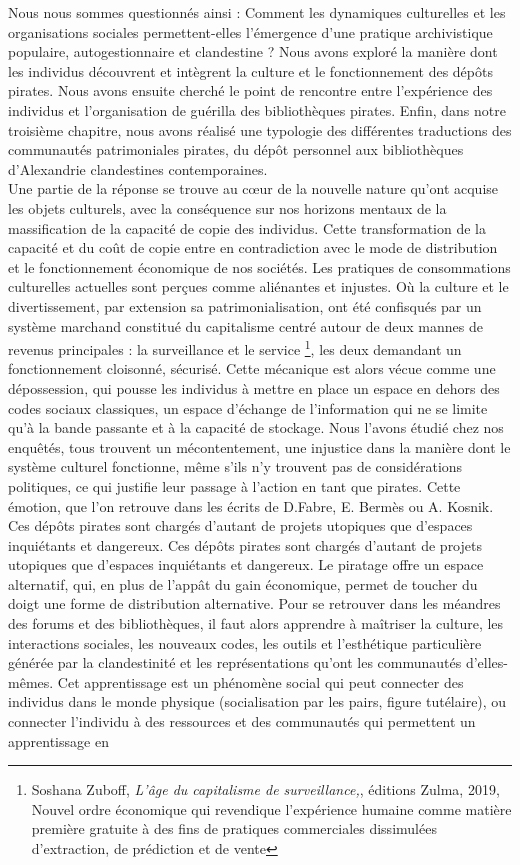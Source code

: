 Nous nous sommes questionnés ainsi : Comment les dynamiques culturelles et les organisations sociales permettent-elles l'émergence d'une pratique archivistique populaire, autogestionnaire et clandestine ? Nous avons exploré la manière dont les individus découvrent et intègrent la culture et le fonctionnement des dépôts pirates. Nous avons ensuite cherché le point de rencontre entre l'expérience des individus et l'organisation de guérilla des bibliothèques pirates. Enfin, dans notre troisième chapitre, nous avons réalisé une typologie des différentes traductions des communautés patrimoniales pirates, du dépôt personnel aux bibliothèques d'Alexandrie clandestines contemporaines.\\

Une partie de la réponse se trouve au cœur de la nouvelle nature qu'ont acquise les objets culturels, avec la conséquence sur nos horizons mentaux de la massification de la capacité de copie des individus. Cette transformation de la capacité et du coût de copie entre en contradiction avec le mode de distribution et le fonctionnement économique de nos sociétés. Les pratiques de consommations culturelles actuelles sont perçues comme aliénantes et injustes. Où la culture et le divertissement, par extension sa patrimonialisation, ont été confisqués par un système marchand constitué du capitalisme centré autour de deux mannes de revenus principales : la surveillance et le service \footnote{Soshana Zuboff, \textit{L'âge du capitalisme de surveillance,}, éditions Zulma, 2019, \og Nouvel ordre économique qui revendique l'expérience humaine comme matière première gratuite à des fins de pratiques commerciales dissimulées d'extraction, de prédiction et de vente \fg }, les deux demandant un fonctionnement cloisonné, sécurisé. Cette mécanique est alors vécue comme une dépossession, qui pousse les individus à mettre en place un espace en dehors des codes sociaux classiques, un espace d'échange de l'information qui ne se limite qu'à la bande passante et à la capacité de stockage. Nous l'avons étudié chez nos enquêtés, tous trouvent un mécontentement, une injustice dans la manière dont le système culturel fonctionne, même s'ils n'y trouvent pas de considérations politiques, ce qui justifie leur passage à l'action en tant que pirates. Cette émotion, que l'on retrouve dans les écrits de D.Fabre, E. Bermès ou A. Kosnik. Ces dépôts pirates sont chargés d’autant de projets utopiques que d'espaces inquiétants et dangereux. Ces dépôts pirates sont chargés d’autant de projets utopiques que d'espaces inquiétants et dangereux. Le piratage offre un espace alternatif, qui, en plus de l’appât du gain économique, permet de toucher du doigt une forme de distribution alternative. Pour se retrouver dans les méandres des forums et des bibliothèques, il faut alors apprendre à maîtriser la culture, les interactions sociales, les nouveaux codes, les outils et l'esthétique particulière générée par la clandestinité et les représentations qu'ont les communautés d'elles-mêmes. Cet apprentissage est un phénomène social qui peut connecter des individus dans le monde physique (socialisation par les pairs, figure tutélaire), ou connecter l'individu à des ressources et des communautés qui permettent un apprentissage en 
